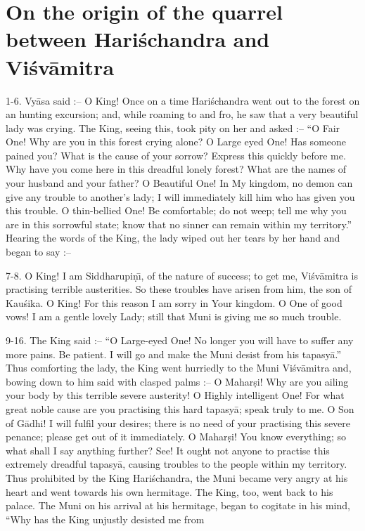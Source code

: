 \chapter{On the origin of the quarrel between Hari\'schandra and Vi\'sv\=amitra}

1-6. Vy\=asa said :-- O King! Once on a time Hari\'schandra went out to the forest on an hunting excursion; and, while roaming to and fro, he saw that a very beautiful lady was crying. The King, seeing this, took pity on her and asked :-- ``O Fair One! Why are you in this forest crying alone? O Large eyed One! Has someone pained you? What is the cause of your sorrow? Express this quickly before me. Why have you come here in this dreadful lonely forest? What are the names of your husband and your father? O Beautiful One! In My kingdom, no demon can give any trouble to another's lady; I will immediately kill him who has given you this trouble. O thin-bellied One! Be comfortable; do not weep; tell me why you are in this sorrowful state; know that no sinner can remain within my territory.'' Hearing the words of the King, the lady wiped out her tears by her hand and began to say :--

7-8. O King! I am Siddharupi\d{n}\={\i}, of the nature of success; to get me, Vi\'sv\=amitra is practising terrible austerities. So these troubles have arisen from him, the son of Kau\'sika. O King! For this reason I am sorry in Your kingdom. O One of good vows! I am a gentle lovely Lady; still that Muni is giving me so much trouble.

9-16. The King said :-- ``O Large-eyed One! No longer you will have to suffer any more pains. Be patient. I will go and make the Muni desist from his tapasy\=a.'' Thus comforting the lady, the King went hurriedly to the Muni Vi\'sv\=amitra and, bowing down to him said with clasped palms :-- O Mahar\d{s}i! Why are you ailing your body by this terrible severe austerity! O Highly intelligent One! For what great noble cause are you practising this hard tapasy\=a; speak truly to me. O Son of G\=adhi! I will fulfil your desires; there is no need of your practising this severe penance; please get out of it immediately. O Mahar\d{s}i! You know everything; so what shall I say anything further? See! It ought not anyone to practise this extremely dreadful tapasy\=a, causing troubles to the people within my territory. Thus prohibited by the King Hari\'schandra, the Muni became very angry at his heart and went towards his own hermitage. The King, too, went back to his palace. The Muni on his arrival at his hermitage, began to cogitate in his mind, ``Why has the King unjustly desisted me from


